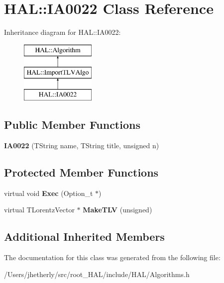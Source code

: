 \hypertarget{class_h_a_l_1_1_i_a0022}{\section{H\-A\-L\-:\-:I\-A0022 Class Reference}
\label{class_h_a_l_1_1_i_a0022}
}
Inheritance diagram for H\-A\-L\-:\-:I\-A0022\-:\begin{figure}[H]
\begin{center}
\leavevmode
\includegraphics[height=3.000000cm]{class_h_a_l_1_1_i_a0022}
\end{center}
\end{figure}
\subsection*{Public Member Functions}
\begin{DoxyCompactItemize}
\item 
\hypertarget{class_h_a_l_1_1_i_a0022_a48f4c965f951daf7b2c385a9b130c83b}{{\bfseries I\-A0022} (T\-String name, T\-String title, unsigned n)}\label{class_h_a_l_1_1_i_a0022_a48f4c965f951daf7b2c385a9b130c83b}

\end{DoxyCompactItemize}
\subsection*{Protected Member Functions}
\begin{DoxyCompactItemize}
\item 
\hypertarget{class_h_a_l_1_1_i_a0022_a05dd9817ef69c14764f0df25376b8416}{virtual void {\bfseries Exec} (Option\-\_\-t $\ast$)}\label{class_h_a_l_1_1_i_a0022_a05dd9817ef69c14764f0df25376b8416}

\item 
\hypertarget{class_h_a_l_1_1_i_a0022_a919cc866aebae44cbf5dbcaeb09ace3d}{virtual T\-Lorentz\-Vector $\ast$ {\bfseries Make\-T\-L\-V} (unsigned)}\label{class_h_a_l_1_1_i_a0022_a919cc866aebae44cbf5dbcaeb09ace3d}

\end{DoxyCompactItemize}
\subsection*{Additional Inherited Members}


The documentation for this class was generated from the following file\-:\begin{DoxyCompactItemize}
\item 
/\-Users/jhetherly/src/root\-\_\-\-H\-A\-L/include/\-H\-A\-L/Algorithms.\-h\end{DoxyCompactItemize}
